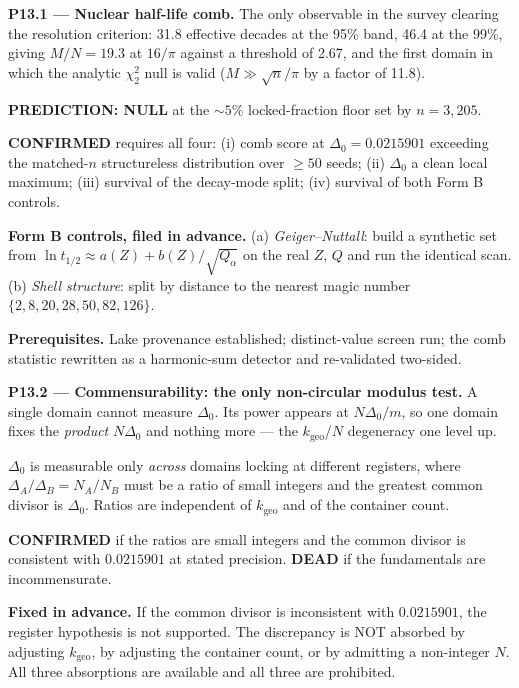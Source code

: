\documentclass[11pt, letterpaper, openany]{book}
\newcommand{\kgeo}{k_{\mathrm{geo}}}
\newcommand{\MN}{M/N}
\begin{document}
\begin{predictionbox}
\textbf{P13.1 --- Nuclear half-life comb.} The only observable in the survey clearing the resolution
criterion: 31.8 effective decades at the 95\% band, 46.4 at the 99\%, giving $\MN = 19.3$ at
$16/\pi$ against a threshold of 2.67, and the first domain in which the analytic $\chi^2_2$ null is
valid ($M \gg \sqrt{n}/\pi$ by a factor of 11.8).

\textbf{PREDICTION: NULL} at the $\sim 5\%$ locked-fraction floor set by $n = 3{,}205$.

\textbf{CONFIRMED} requires all four: (i) comb score at $\Delta_0 = 0.0215901$ exceeding the
matched-$n$ structureless distribution over $\geq 50$ seeds; (ii) $\Delta_0$ a clean local maximum;
(iii) survival of the decay-mode split; (iv) survival of both Form B controls.

\textbf{Form B controls, filed in advance.} (a) \emph{Geiger--Nuttall}: build a synthetic set from
$\ln t_{1/2} \approx a(Z) + b(Z)/\sqrt{Q_\alpha}$ on the real $Z$, $Q$ and run the identical scan.
(b) \emph{Shell structure}: split by distance to the nearest magic number
$\{2,8,20,28,50,82,126\}$.

\textbf{Prerequisites.} Lake provenance established; distinct-value screen run; the comb statistic
rewritten as a harmonic-sum detector and re-validated two-sided.
\end{predictionbox}

\begin{predictionbox}
\textbf{P13.2 --- Commensurability: the only non-circular modulus test.} A single domain cannot
measure $\Delta_0$. Its power appears at $N\Delta_0/m$, so one domain fixes the \emph{product}
$N\Delta_0$ and nothing more --- the $\kgeo$/$N$ degeneracy one level up.

$\Delta_0$ is measurable only \emph{across} domains locking at different registers, where
$\Delta_A/\Delta_B = N_A/N_B$ must be a ratio of small integers and the greatest common divisor is
$\Delta_0$. Ratios are independent of $\kgeo$ and of the container count.

\textbf{CONFIRMED} if the ratios are small integers and the common divisor is consistent with
$0.0215901$ at stated precision. \textbf{DEAD} if the fundamentals are incommensurate.

\textbf{Fixed in advance.} If the common divisor is inconsistent with $0.0215901$, the register
hypothesis is not supported. The discrepancy is NOT absorbed by adjusting $\kgeo$, by adjusting the
container count, or by admitting a non-integer $N$. All three absorptions are available and all
three are prohibited.
\end{predictionbox}
\end{document}
